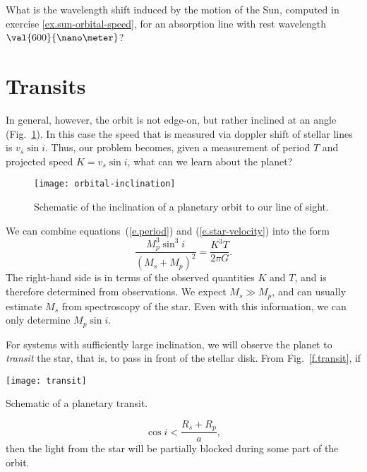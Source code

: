 \begin{exercisebox}
	What is the wavelength shift induced by the motion of the Sun, computed in exercise \ref{ex.sun-orbital-speed}, for an absorption line with rest wavelength $\val{600}{\nano\meter}$?
\end{exercisebox}

\section{Transits}

In general, however, the orbit is not edge-on, but rather inclined at an angle (Fig.~\ref{f.orbital-inclination}).
In this case the speed that is measured via doppler shift of stellar lines is $v_{s}\sin i$.  Thus, our problem becomes, given a measurement of period $T$ and projected speed $K = v_{s}\sin i$, what can we learn about the planet?

\begin{figure}[ht]
\texttt{[image: orbital-inclination]}
\caption[Schematic of the inclination of a planetary orbit]{Schematic of the inclination of a planetary orbit to our line of sight.}
\label{f.orbital-inclination}
\end{figure}

We can combine equations~(\ref{e.period}) and (\ref{e.star-velocity}) into the form
\begin{equation}\label{e.mass-fcn}
	\frac{M_{p}^{3}\sin^{3}i}{(M_{s}+M_{p})^{2}} = \frac{K^{3}T}{2\pi G}.
\end{equation}
The right-hand side is in terms of the observed quantities $K$ and $T$, and is therefore determined from observations.  We expect $M_{s} \gg M_{p}$, and can usually estimate $M_{s}$ from spectroscopy of the star.  Even with this information, we can only determine $M_{p}\sin i$.

For systems with sufficiently large inclination, we will observe the planet to \emph{transit} the star, that is, to pass in front of the stellar disk. From Fig.~\ref{f.transit}, if
\begin{marginfigure}
\texttt{[image: transit]}
\caption[Schematic of a planetary transit]{Schematic of a planetary transit.}
\label{f.transit}
\end{marginfigure}
\[	\cos i < \frac{R_{s}+R_{p}}{a},	\]
then the light from the star will be partially blocked during some part of the orbit.


